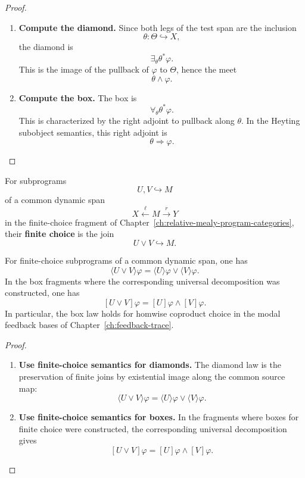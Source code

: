 \begin{proof}
\leavevmode
\begin{enumerate}
  \item \textbf{Compute the diamond.}
  Since both legs of the test span are the inclusion
  \[
    \theta:\Theta\hookrightarrow X,
  \]
  the diamond is
  \[
    \exists_{\theta}\theta^*\varphi.
  \]
  This is the image of the pullback of \(\varphi\) to \(\Theta\), hence the
  meet
  \[
    \theta\wedge\varphi.
  \]

  \item \textbf{Compute the box.}
  The box is
  \[
    \forall_{\theta}\theta^*\varphi.
  \]
  This is characterized by the right adjoint to pullback along
  \(\theta\).  In the Heyting subobject semantics, this right adjoint is
  \[
    \theta\Rightarrow\varphi.
  \]
\end{enumerate}
\end{proof}

\begin{definition}
\label{def:finite-choice-subprograms}
For subprograms
\[
  U,V\hookrightarrow M
\]
of a common dynamic span
\[
  X\xleftarrow{\ell}M\xrightarrow{r}Y
\]
in the finite-choice fragment of
Chapter~\ref{ch:relative-mealy-program-categories},
their \textbf{finite choice} is the join
\[
  U\vee V\hookrightarrow M.
\]
\end{definition}

\begin{proposition}
\label{prop:finite-choice-laws}
For finite-choice subprograms of a common dynamic span, one has
\[
  \langle U\vee V\rangle\varphi
  =
  \langle U\rangle\varphi
  \vee
  \langle V\rangle\varphi.
\]
In the box fragments where the corresponding universal decomposition was
constructed, one has
\[
  [U\vee V]\varphi
  =
  [U]\varphi
  \wedge
  [V]\varphi.
\]
In particular, the box law holds for homwise coproduct choice in the modal
feedback bases of Chapter~\ref{ch:feedback-trace}.
\end{proposition}

\begin{proof}
\leavevmode
\begin{enumerate}
  \item \textbf{Use finite-choice semantics for diamonds.}
  The diamond law is the preservation of finite joins by existential image
  along the common source map:
  \[
    \langle U\vee V\rangle\varphi
    =
    \langle U\rangle\varphi
    \vee
    \langle V\rangle\varphi.
  \]

  \item \textbf{Use finite-choice semantics for boxes.}
  In the fragments where boxes for finite choice were constructed, the
  corresponding universal decomposition gives
  \[
    [U\vee V]\varphi
    =
    [U]\varphi
    \wedge
    [V]\varphi.
  \]
\end{enumerate}
\end{proof}

